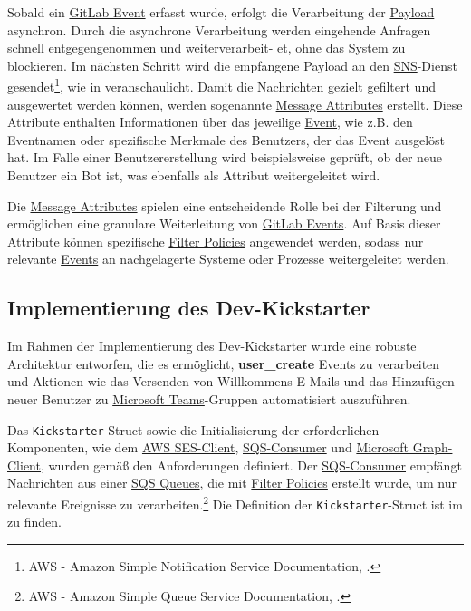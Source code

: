 Sobald ein \hyperlink{GitLabEvent}{\textcolor{AOBlau}{GitLab Event}} erfasst wurde, erfolgt die Verarbeitung der \hyperlink{Payload}{\textcolor{AOBlau}{Payload}} asynchron. Durch die asynchrone Verarbeitung werden eingehende Anfragen schnell entgegengenommen und weiterverarbeit-
et, ohne das System zu blockieren. Im nächsten Schritt wird die empfangene Payload an den \hyperlink{SNS}{\textcolor{AOBlau}{SNS}}-Dienst gesendet\footnote{AWS - Amazon Simple Notification Service Documentation, \cite{aws2023sns}.}, wie in  veranschaulicht. Damit die Nachrichten gezielt gefiltert und ausgewertet werden können, werden sogenannte \hyperlink{MessageAttributes}{\textcolor{AOBlau}{Message Attributes}} erstellt. Diese Attribute enthalten Informationen über das jeweilige \hyperlink{GitLabEvent}{\textcolor{AOBlau}{Event}}, wie z.B. den Eventnamen oder spezifische Merkmale des Benutzers, der das Event ausgelöst hat. Im Falle einer Benutzererstellung wird beispielsweise geprüft, ob der neue Benutzer ein Bot ist, was ebenfalls als Attribut weitergeleitet wird.

Die \hyperlink{MessageAttributes}{\textcolor{AOBlau}{Message Attributes}} spielen eine entscheidende Rolle bei der Filterung und ermöglichen eine granulare Weiterleitung von \hyperlink{GitLabEvent}{\textcolor{AOBlau}{GitLab Events}}. Auf Basis dieser Attribute können spezifische \hyperlink{FilterPolicies}{\textcolor{AOBlau}{Filter Policies}} angewendet werden, sodass nur relevante \hyperlink{Events}{\textcolor{AOBlau}{Events}} an nachgelagerte Systeme oder Prozesse weitergeleitet werden.

\subsection{Implementierung des Dev-Kickstarter}
\label{sec:ImplementierungBenutzeroberflaeche}

Im Rahmen der Implementierung des Dev-Kickstarter wurde eine robuste Architektur entworfen, die es ermöglicht, \textbf{user\_create} Events zu verarbeiten und Aktionen wie das Versenden von Willkommens-E-Mails und das Hinzufügen neuer Benutzer zu \hyperlink{MicrosoftTeams}{\textcolor{AOBlau}{Microsoft Teams}}-Gruppen automatisiert auszuführen.

Das \texttt{Kickstarter}-Struct sowie die Initialisierung der erforderlichen Komponenten, wie dem \hyperlink{AWSSESClient}{\textcolor{AOBlau}{AWS SES-Client}}, \hyperlink{SQSConsumer}{\textcolor{AOBlau}{SQS-Consumer}} und \hyperlink{GraphClient}{\textcolor{AOBlau}{Microsoft Graph-Client}}, wurden gemäß den Anforderungen definiert. Der \hyperlink{SQSConsumer}{\textcolor{AOBlau}{SQS-Consumer}} empfängt Nachrichten aus einer \hyperlink{SQS}{\textcolor{AOBlau}{SQS Queues}}, die mit \hyperlink{FilterPolicies}{\textcolor{AOBlau}{Filter Policies}} erstellt wurde, um nur relevante Ereignisse zu verarbeiten.\footnote{AWS - Amazon Simple Queue Service Documentation, \cite{aws2023sqs}.} Die Definition der \texttt{Kickstarter}-Struct ist im  zu finden.

